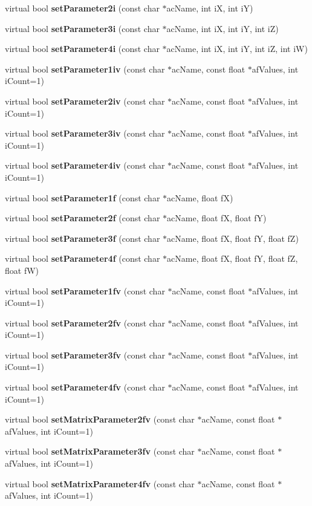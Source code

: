 \begin{CompactItemize}
virtual bool {\bf set\-Parameter2i} (const char $\ast$ac\-Name, int i\-X, int i\-Y)
\item 
virtual bool {\bf set\-Parameter3i} (const char $\ast$ac\-Name, int i\-X, int i\-Y, int i\-Z)
\item 
virtual bool {\bf set\-Parameter4i} (const char $\ast$ac\-Name, int i\-X, int i\-Y, int i\-Z, int i\-W)
\item 
virtual bool {\bf set\-Parameter1iv} (const char $\ast$ac\-Name, const float $\ast$af\-Values, int i\-Count=1)
\item 
virtual bool {\bf set\-Parameter2iv} (const char $\ast$ac\-Name, const float $\ast$af\-Values, int i\-Count=1)
\item 
virtual bool {\bf set\-Parameter3iv} (const char $\ast$ac\-Name, const float $\ast$af\-Values, int i\-Count=1)
\item 
virtual bool {\bf set\-Parameter4iv} (const char $\ast$ac\-Name, const float $\ast$af\-Values, int i\-Count=1)
\item 
virtual bool {\bf set\-Parameter1f} (const char $\ast$ac\-Name, float f\-X)
\item 
virtual bool {\bf set\-Parameter2f} (const char $\ast$ac\-Name, float f\-X, float f\-Y)
\item 
virtual bool {\bf set\-Parameter3f} (const char $\ast$ac\-Name, float f\-X, float f\-Y, float f\-Z)
\item 
virtual bool {\bf set\-Parameter4f} (const char $\ast$ac\-Name, float f\-X, float f\-Y, float f\-Z, float f\-W)
\item 
virtual bool {\bf set\-Parameter1fv} (const char $\ast$ac\-Name, const float $\ast$af\-Values, int i\-Count=1)
\item 
virtual bool {\bf set\-Parameter2fv} (const char $\ast$ac\-Name, const float $\ast$af\-Values, int i\-Count=1)
\item 
virtual bool {\bf set\-Parameter3fv} (const char $\ast$ac\-Name, const float $\ast$af\-Values, int i\-Count=1)
\item 
virtual bool {\bf set\-Parameter4fv} (const char $\ast$ac\-Name, const float $\ast$af\-Values, int i\-Count=1)
\item 
virtual bool {\bf set\-Matrix\-Parameter2fv} (const char $\ast$ac\-Name, const float $\ast$af\-Values, int i\-Count=1)
\item 
virtual bool {\bf set\-Matrix\-Parameter3fv} (const char $\ast$ac\-Name, const float $\ast$af\-Values, int i\-Count=1)
\item 
virtual bool {\bf set\-Matrix\-Parameter4fv} (const char $\ast$ac\-Name, const float $\ast$af\-Values, int i\-Count=1)
\end{CompactItemize}
